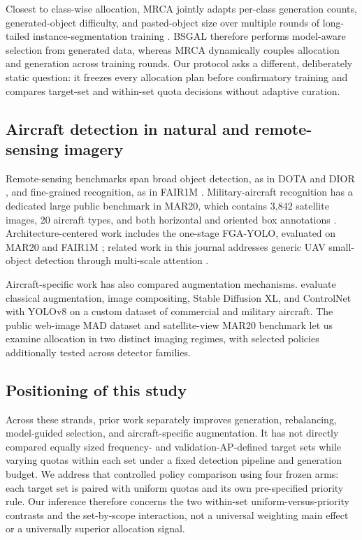 \documentclass[preprint,12pt,authoryear]{elsarticle}
\begin{document}
Closest to class-wise allocation, MRCA jointly adapts per-class generation
counts, generated-object difficulty, and pasted-object size over multiple
rounds of long-tailed instance-segmentation training
\citep{kim2025mrca}. BSGAL therefore performs model-aware selection from
generated data, whereas MRCA dynamically couples allocation and generation
across training rounds. Our protocol asks a different, deliberately static
question: it freezes every allocation plan before confirmatory training and
compares target-set and within-set quota decisions without adaptive
curation.

\subsection{Aircraft detection in natural and remote-sensing imagery}
Remote-sensing benchmarks span broad object detection, as in DOTA
\citep{xia2018dota} and DIOR \citep{li2020dior}, and fine-grained
recognition, as in FAIR1M \citep{sun2022fair1m}. Military-aircraft
recognition has a dedicated large public benchmark in MAR20, which
contains 3{,}842 satellite images, 20 aircraft types, and both horizontal
and oriented box annotations \citep{yu2023mar20}. Architecture-centered
work includes the one-stage FGA-YOLO, evaluated on MAR20 and FAIR1M
\citep{wu2025fga}; related work in this journal addresses generic UAV
small-object detection through multi-scale attention
\citep{song2024small}.

Aircraft-specific work has also compared augmentation mechanisms.
\citet{shermaine2025compositing} evaluate classical augmentation, image
compositing, Stable Diffusion XL, and ControlNet with YOLOv8 on a custom
dataset of commercial and military aircraft. The public web-image MAD
dataset and satellite-view MAR20 benchmark let us examine allocation in
two distinct imaging regimes, with selected policies additionally tested
across detector families.

\subsection{Positioning of this study}
Across these strands, prior work separately improves generation,
rebalancing, model-guided selection, and aircraft-specific augmentation.
It has not directly compared equally sized frequency- and
validation-AP-defined target sets while varying quotas within each set
under a fixed detection pipeline and generation budget. We address that
controlled policy comparison using four frozen arms: each target set is
paired with uniform quotas and its own pre-specified priority rule. Our
inference therefore concerns the two within-set uniform-versus-priority
contrasts and the set-by-scope interaction, not a universal weighting
main effect or a universally superior allocation signal.
\end{document}
